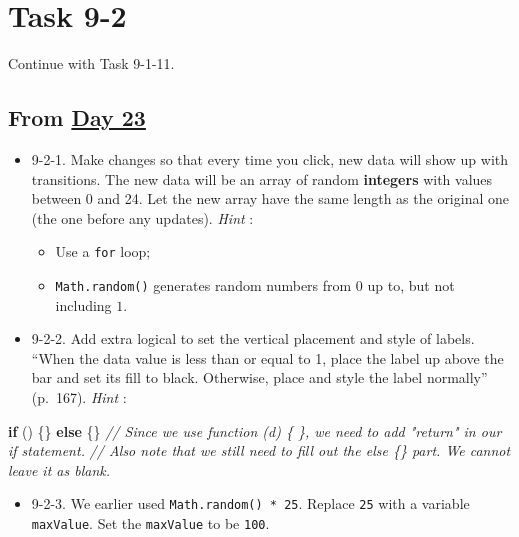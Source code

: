 \documentclass[
]{book}
\newenvironment{Shaded}{\begin{snugshade}}{\end{snugshade}}
\newcommand{\CommentTok}[1]{\textcolor[rgb]{0.56,0.35,0.01}{\textit{#1}}}
\newcommand{\ControlFlowTok}[1]{\textcolor[rgb]{0.13,0.29,0.53}{\textbf{#1}}}
\newcommand{\NormalTok}[1]{#1}
\providecommand{\tightlist}{%
  \setlength{\itemsep}{0pt}\setlength{\parskip}{0pt}}
\begin{document}
\hypertarget{task-9-2}{%
\section{Task 9-2}\label{task-9-2}}

Continue with Task 9-1-11.

\hypertarget{from-day-23}{%
\subsection{\texorpdfstring{From \href{https://observablehq.com/@hongtaoh/day-twenty-three-2020-09-16}{Day 23}}{From Day 23}}\label{from-day-23}}

\begin{itemize}
\item
  9-2-1. Make changes so that every time you click, new data will show up with transitions. The new data will be an array of random \textbf{integers} with values between 0 and 24. Let the new array have the same length as the original one (the one before any updates). \emph{Hint} :

  \begin{itemize}
  \item
    Use a \texttt{for} loop;
  \item
    \texttt{Math.random()} generates random numbers from \(0\) up to, but not including \(1\).
  \end{itemize}
\item
  9-2-2. Add extra logical to set the vertical placement and style of labels. ``When the data value is less than or equal to 1, place the label up above the bar and set its fill to black. Otherwise, place and style the label normally'' (p.~167). \emph{Hint} :
\end{itemize}

\begin{Shaded}
\begin{Highlighting}[]
\ControlFlowTok{if}\NormalTok{ () \{\}}
  \ControlFlowTok{else}\NormalTok{ \{\} }
\CommentTok{// Since we use function (d) \{ \}, we need to add "return" in our if statement.}
\CommentTok{// Also note that we still need to fill out the else \{\} part. We cannot leave it as blank. }
\end{Highlighting}
\end{Shaded}

\begin{itemize}
\tightlist
\item
  9-2-3. We earlier used \texttt{Math.random()\ *\ 25}. Replace \texttt{25} with a variable \texttt{maxValue}. Set the \texttt{maxValue} to be \texttt{100}.
\end{itemize}
\end{document}
